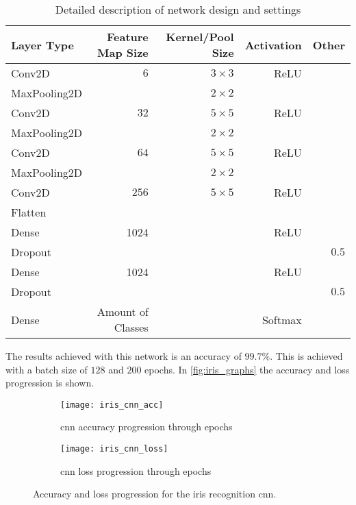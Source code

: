 \begin{table}[H]
	\centering
	\caption{Detailed description of network design and settings}
	\label{tab:iris_cnn}
	\begin{tabular}{lrrrr}
		\textbf{Layer Type}   & \textbf{Feature Map Size}  & \textbf{Kernel/Pool Size} & \textbf{Activation} & \textbf{Other} \\ \hline
		Conv2D       & $6$               & $3\times3$       & ReLU       &       \\
		\rowcolor{lightGrey} 
		MaxPooling2D &                   & $2\times2$       &            &       \\
		Conv2D       & $32$              & $5\times5$       & ReLU       &       \\
		\rowcolor{lightGrey} 
		MaxPooling2D &                   & $2\times2$       &            &       \\
		Conv2D       & $64$              & $5\times5$       & ReLU       &       \\
		\rowcolor{lightGrey} 
		MaxPooling2D &                   & $2\times2$       &            &       \\
		Conv2D       & $256$             & $5\times5$       & ReLU       &       \\
		\rowcolor{lightGrey} 
		Flatten      &                   &                  &            &       \\
		Dense        & 1024              &                  & ReLU           &       \\
		\rowcolor{lightGrey} 
		Dropout      &                   &                  &            & $0.5$ \\
		Dense        & 1024              &                  & ReLU           &       \\
		\rowcolor{lightGrey} 
		Dropout      &                   &                  &            & $0.5$ \\
		Dense        & Amount of Classes &                  & Softmax   &      
	\end{tabular}
\end{table}

The results achieved with this network is an accuracy of $99.7\%$. This is achieved with a batch size of $128$ and $200$ epochs. In \autoref{fig:iris_graphs} the accuracy and loss progression is shown.

\begin{figure}[H]
	\centering
	\begin{subfigure}{0.48\textwidth}
		\centering
		\texttt{[image: iris\_cnn\_acc]}
		\caption{\gls{cnn} accuracy progression through epochs}
		\label{fig:iris_cnn_acc}
	\end{subfigure}
	\begin{subfigure}{0.48\textwidth}
		\centering
		\texttt{[image: iris\_cnn\_loss]}
		\caption{\gls{cnn} loss progression through epochs}
		\label{fig:iris_cnn_loss}
	\end{subfigure}
	\caption{Accuracy and loss progression for the iris recognition \gls{cnn}.}
	\label{fig:iris_graphs}
\end{figure}

